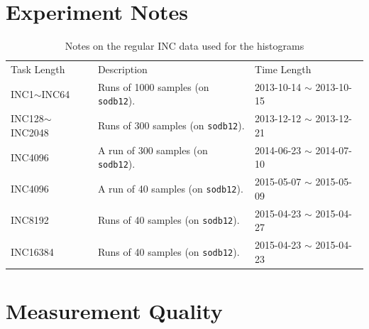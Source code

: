 \documentclass[10pt]{article}
\begin{document}
\section{Experiment Notes}
\begin{table}[h]
\begin{center}
\begin{tabular}{|p{3cm}||p{9cm}|p{4cm}|} \hline
Task Length & Description & Time Length\\ \cline{1-3}
INC1$\sim$INC64 & Runs of 1000 samples (on {\tt sodb12}). & 2013-10-14 $\sim$ 2013-10-15\\ \hline
INC128$\sim$INC2048 & Runs of 300 samples (on {\tt sodb12}). & 2013-12-12 $\sim$ 2013-12-21\\ \hline 
INC4096 & A run of 300 samples (on {\tt sodb12}). & 2014-06-23 $\sim$ 2014-07-10 \\ \hline 
INC4096 & A run of 40 samples (on {\tt sodb12}). & 2015-05-07 $\sim$ 2015-05-09  \\ \hline 
INC8192 & Runs of 40 samples (on {\tt sodb12}). & 2015-04-23 $\sim$ 2015-04-27\\ \hline
INC16384 & Runs of 40 samples (on {\tt sodb12}). & 2015-04-23 $\sim$ 2015-04-23 \\ \hline 
\end{tabular}
\end{center}
\vspace{-.2in}
\caption{Notes on the regular INC data used for the histograms\label{tab:exp_notes1}}
\end{table}


\section{Measurement Quality~\label{sec:meq}}
\end{document}
